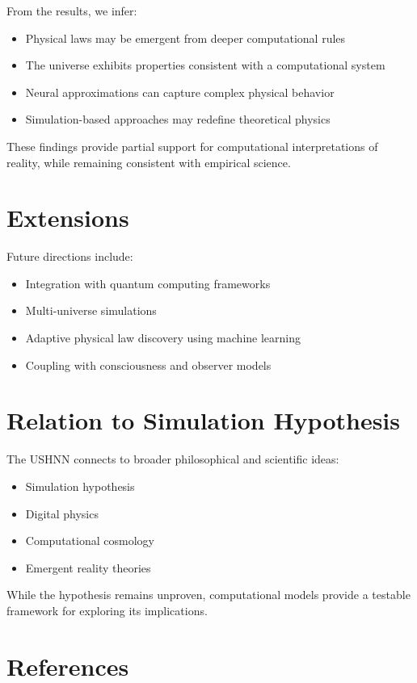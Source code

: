 \documentclass[12pt]{article}
\begin{document}
From the results, we infer:

\begin{itemize}
\item Physical laws may be emergent from deeper computational rules
\item The universe exhibits properties consistent with a computational system
\item Neural approximations can capture complex physical behavior
\item Simulation-based approaches may redefine theoretical physics
\end{itemize}

These findings provide partial support for computational interpretations of reality, while remaining consistent with empirical science.

\section{Extensions}

Future directions include:

\begin{itemize}
\item Integration with quantum computing frameworks
\item Multi-universe simulations
\item Adaptive physical law discovery using machine learning
\item Coupling with consciousness and observer models
\end{itemize}

\section{Relation to Simulation Hypothesis}

The USHNN connects to broader philosophical and scientific ideas:

\begin{itemize}
\item Simulation hypothesis
\item Digital physics
\item Computational cosmology
\item Emergent reality theories
\end{itemize}

While the hypothesis remains unproven, computational models provide a testable framework for exploring its implications.

\section{References}
\end{document}

